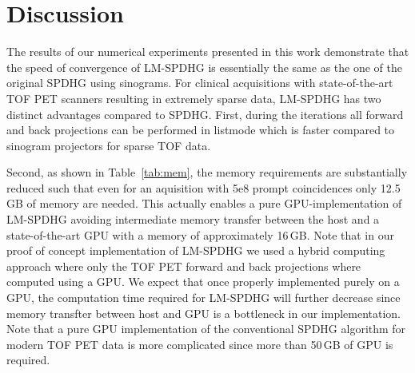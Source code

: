 
\section{Discussion}

The results of our numerical experiments presented in this work demonstrate that the speed of 
convergence of LM-SPDHG is essentially the same as the one of the original SPDHG using
sinograms.
For clinical acquisitions with state-of-the-art TOF PET scanners resulting in extremely
sparse data, LM-SPDHG has two distinct advantages compared to SPDHG.
First, during the iterations all forward and back projections can be performed in listmode
which is faster compared to sinogram projectors for sparse TOF data.

Second, as shown in Table~\ref{tab:mem}, the memory requirements are substantially reduced such
that even for an aquisition with 5e8 prompt coincidences only 12.5\,GB of memory are needed.
This actually enables a pure GPU-implementation of LM-SPDHG avoiding intermediate memory
transfer between the host and a state-of-the-art GPU with a memory of approximately 16\,GB.
Note that in our proof of concept implementation of LM-SPDHG we used a hybrid computing
approach where only the TOF PET forward and back projections where computed using a GPU.
We expect that once properly implemented purely on a GPU, the computation time required
for LM-SPDHG will further decrease since memory transfter between host and GPU is a bottleneck 
in our implementation.
Note that a pure GPU implementation of the conventional SPDHG algorithm for modern TOF PET
data is more complicated since more than 50\,GB of GPU is required.

